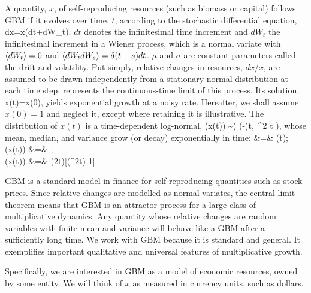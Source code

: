 A quantity, $x$, of self-reproducing resources (such as biomass or capital) follows GBM if it evolves over time, $t$, according to the \Ito stochastic differential equation,
\be
dx=x(\mu dt+\sigma dW_t).
\ee
$dt$ denotes the infinitesimal time increment and $dW_t$ the infinitesimal increment in a Wiener process, which is a normal variate with $\left\langle dW_t \right\rangle=0$ and $\left\langle dW_t dW_s \right\rangle=\delta(t-s) dt$. $\mu$ and $\sigma$ are constant parameters called the drift and volatility. Put simply, relative changes in resources, $dx/x$, are assumed to be drawn independently from a stationary normal distribution at each time step.  represents the continuous-time limit of this process. Its solution,
\be
x(t)=x(0)\exp{},
\ee
yields exponential growth at a noisy rate. Hereafter, we shall assume $x(0)=1$ and neglect it, except where retaining it is illustrative. The distribution of $x(t)$ is a time-dependent log-normal,
\be
\ln(x(t)) \sim {}\left( \left(\mu-\right)t,\, \sigma^2 t \right),
\ee
whose mean, median, and variance grow (or decay) exponentially in time:
\bea
{} &=& \exp(\mu t); \\
(x(t)) &=& \exp[(\mu-\sigma^2/2)t]; \\
(x(t)) &=& \exp(2\mu t)[\exp(\sigma^2t)-1]. 
\eea

GBM is a standard model in finance for self-reproducing quantities such as stock prices. Since relative changes are modelled as normal variates, the central limit theorem means that GBM is an attractor process for a large class of multiplicative dynamics. Any quantity whose relative changes are random variables with finite mean and variance will behave 
like a GBM after a sufficiently long time. We work with GBM because it is standard and general. It exemplifies important qualitative and universal features
of multiplicative growth.

Specifically, we are interested in GBM as a model of economic resources, owned by some entity. We will think of $x$ as measured in currency units, such as dollars.

